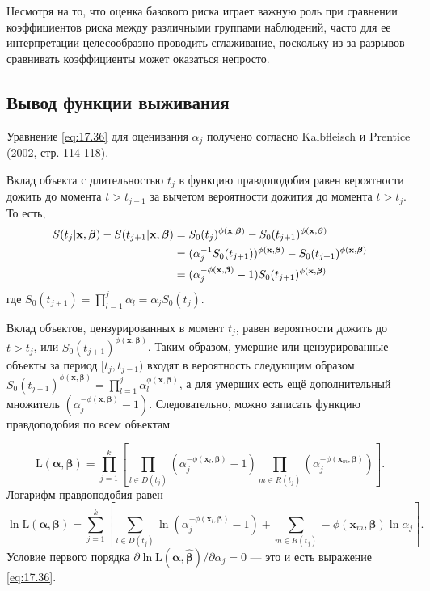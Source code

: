 Несмотря на то, что оценка базового риска играет важную роль при сравнении коэффициентов риска между различными группами наблюдений, часто для ее интерпретации целесообразно проводить сглаживание, поскольку из-за разрывов сравнивать коэффициенты может оказаться непросто.


\subsection{Вывод функции выживания}\label{sec:17.8.4}

\noindent
Уравнение \ref{eq:17.36} для оценивания $\alpha_j$ получено согласно Kalbfleisch и Prentice (2002, стр. 114-118).

Вклад объекта с длительностью $t_j$ в функцию правдоподобия равен вероятности дожить до момента $t>t_{j-1}$ за вычетом вероятности дожития до момента $t>t_j$. То есть,
        \begin{align}
        S(t_j|\mathbf{x},\bm{\beta})-S(t_{j+1}|\mathbf{x},\bm{\beta})&=S_0(t_j)^{\phi(\mathbf{x},\bm{\beta})}-S_0(t_{j+1})^{\phi(\mathbf{x},\bm{\beta})}\notag\\
        &=(\alpha^{-1}_jS_0(t_{j+1}))^{\phi(\mathbf{x},\bm{\beta})}-S_0(t_{j+1})^{\phi(\mathbf{x},\bm{\beta})}\notag\\
        &=(\alpha^{-\phi(\mathbf{x},\bm{\beta})}_j-1)S_0(t_{j+1})^{\phi(\mathbf{x},\bm{\beta})}\notag
        \end{align}
где $S_0(t_{j+1})=\prod^{j}_{l=1}\alpha_l=\alpha_jS_0(t_j)$. 

Вклад объектов, цензурированных в момент $t_j$, равен вероятности дожить до $t > t_j$, или $S_0(t_{j+1})^{\phi(\mathbf{x},\bm{\beta})}$. Таким образом, умершие или цензурированные объекты за период $[t_j,t_{j-1})$ входят в вероятность следующим образом $S_0(t_{j+1})^{\phi(\mathbf{x},\bm{\beta})}=\prod^{j}_{l=1}\alpha^{\phi(\mathbf{x},\bm{\beta})}_l$, а для умерших есть ещё дополнительный множитель $\left(\alpha^{-\phi(\mathbf{x},\bm{\beta})}_j-1\right)$. Следовательно, можно записать функцию правдоподобия по всем объектам

        $$\mathrm{L}(\bm{\alpha},\bm{\beta})=\prod^{k}_{j=1}\left[\prod_{l\in D(t_j)}(\alpha^{-\phi(\mathbf{x}_l,\bm{\beta})}_j-1)\prod_{m\in R(t_j)}(\alpha^{-\phi(\mathbf{x}_m,\bm{\beta})}_j)\right].$$
Логарифм правдоподобия равен
        $$\ln\mathrm{L}(\bm{\alpha},\bm{\beta})=\sum^{k}_{j=1}\left[\sum_{l\in D(t_j)}\ln(\alpha^{-\phi(\mathbf{x}_l,\bm{\beta})}_j-1)+\sum_{m\in R(t_j)}-\phi(\mathbf{x}_m,\bm{\beta})\ln\alpha_j \right].$$
Условие первого порядка $\partial\ln\mathrm{L}(\bm{\alpha},\bm{\hat{\beta}})/\partial\alpha_j=0$ --- это и есть выражение \ref{eq:17.36}.




